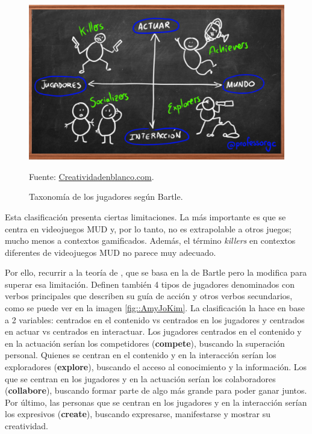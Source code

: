 \begin{figure}[hbt]
\begin{center}
\caption{Taxonomía de los jugadores según Bartle.}
\label{fig::Bartle}
\includegraphics[scale=0.25]{img/Bartle.png}

\vspace{-0.25cm}
\small{Fuente: \url{Creatividadenblanco.com}.}
\end{center}
\end{figure}

Esta clasificación presenta ciertas limitaciones. 
%
La más importante es que se centra en videojuegos \gls{MUD} y, por lo tanto, no es extrapolable a otros juegos; mucho menos a contextos gamificados.
%
Además, el término \textit{killers} en contextos diferentes de videojuegos \gls{MUD} no parece muy adecuado.


%
Por ello, recurrir a la teoría de  \cite{AmyJoKim}, que se basa en la de Bartle pero la modifica para superar esa limitación.
%
Definen también 4 tipos de jugadores denominados con verbos principales que describen su guía de acción y otros verbos secundarios, como se puede ver en la imagen \ref{fig::AmyJoKim}.
%
La clasificación la hace en base a 2 variables: centrados en el contenido vs centrados en los jugadores y centrados en actuar vs centrados en interactuar.
%
Los jugadores centrados en el contenido y en la actuación serían los competidores (\textbf{compete}), buscando la superación personal.
%
Quienes se centran en el contenido y en la interacción serían los exploradores (\textbf{explore}), buscando el acceso al conocimiento y la información.
%
Los que se centran en los jugadores y en la actuación serían los colaboradores (\textbf{collabore}), buscando formar parte de algo más grande para poder ganar juntos.
%
Por último, las personas que se centran en los jugadores y en la interacción serían los expresivos (\textbf{create}), buscando expresarse, manifestarse y mostrar su creatividad.

